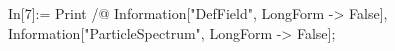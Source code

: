 In[7]:= Print /@ {Information["DefField", LongForm -> False], Information["ParticleSpectrum", LongForm -> False]}; 